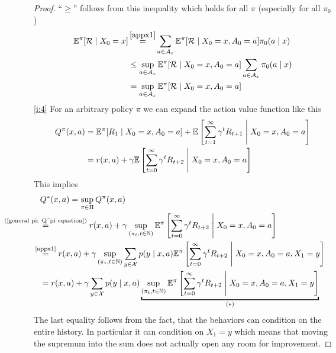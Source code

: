\begin{proof}
	\noindent ``\(\geq\)'' follows from this inequality which holds for all \(\pi\) (especially for all \(\pi_0\))
	\begin{align*}
		\E^\pi[\cR\mid X_0=x]
		&\xeq{\ref{appx1}}\sum_{a\in\cA_x}\E^\pi[\cR \mid X_0=x,A_0=a]\pi_0(a\mid x)\\
		&\leq \sup_{a\in\cA_x}\E^\pi[\cR \mid X_0=x, A_0=a]\sum_{a\in\cA_x}\pi_0(a\mid x)\\
		&=\sup_{a\in\cA_x}\E^\pi[\cR \mid X_0=x, A_0=a]
	\end{align*}
	\ref{i:4} For an arbitrary policy \(\pi\) we can expand the action value function like this
	\begin{align}
		Q^\pi(x,a)&=\mathbb{E}^\pi[R_1\mid X_0=x, A_0=a]
		+\mathbb{E}\left[\sum_{t=1}^\infty \gamma^t R_{t+1}\;\middle|\; X_0=x,A_0=a\right]
		\nonumber\\
		&=r(x,a) + \gamma \mathbb{E}\left[\sum_{t=0}^\infty \gamma^t R_{t+2}\;\middle|\; X_0=x,A_0=a\right] \label{general pi: Q^pi equation}
	\end{align}
	This implies
	\begin{align*}
		&Q^*(x,a)=\sup_{\pi\in\Pi} Q^\pi (x,a)
		\\
		&\lxeq{\text{(\ref{general pi: Q^pi equation})}} r(x,a)
		+ \gamma \sup_{(\pi_t,t\in\N)} \E^\pi\left[\sum_{t=0}^\infty \gamma^t R_{t+2}
		\;\middle|\; X_0=x,A_0=a \right]
		\\
		&\lxeq{\text{\ref{appx1}}}r(x,a)
		+\gamma \sup_{(\pi_t,t\in\N)} \sum_{y\in\cX} p(y\mid x, a)
		\E^\pi\left[\sum_{t=0}^\infty \gamma^t R_{t+2}\;\middle|\; X_0=x,A_0=a, X_1=y \right]
		\\
		&=r(x,a)
		+\gamma \sum_{y\in\cX} p(y\mid x, a) \underbracket{
			\sup_{(\pi_t,t\in\N)}
			\E^\pi\left[\sum_{t=0}^\infty \gamma^t R_{t+2}\;\middle|\; X_0=x,A_0=a, X_1=y \right]
		}_{(*)}
	\end{align*}
	The last equality follows from the fact, that the behaviors can condition on the entire history. In particular it can condition on \(X_1=y\) which means that moving the supremum into the sum does not actually open any room for improvement. 


\end{proof}
